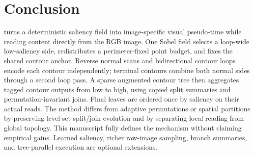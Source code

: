 \section{Conclusion}

\method{} turns a deterministic saliency field into image-specific visual pseudo-time while reading content directly from the RGB image. One Sobel field selects a loop-wide low-saliency side, redistributes a perimeter-fixed point budget, and fixes the shared contour anchor. Reverse normal scans and bidirectional contour loops encode each contour independently; terminal contours combine both normal sides through a second loop pass. A sparse augmented contour tree then aggregates tagged contour outputs from low to high, using copied split summaries and permutation-invariant joins. Final leaves are ordered once by saliency on their actual reads. The method differs from adaptive permutations or spatial partitions by preserving level-set split/join evolution and by separating local reading from global topology. This manuscript fully defines the mechanism without claiming empirical gains. Learned saliency, richer raw-image sampling, branch summaries, and tree-parallel execution are optional extensions.
